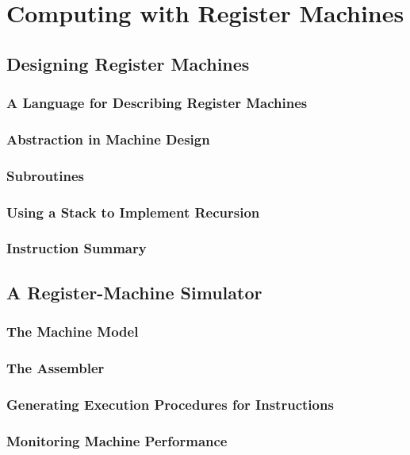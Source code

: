 %

    \section{Computing with Register Machines}
        \subsection{Designing Register Machines}
            \subsubsection{A Language for Describing Register Machines}
            \subsubsection{Abstraction in Machine Design}
            \subsubsection{Subroutines}
            \subsubsection{Using a Stack to Implement Recursion}
            \subsubsection{Instruction Summary}
        \subsection{A Register-Machine Simulator}
            \subsubsection{The Machine Model}
            \subsubsection{The Assembler}
            \subsubsection{Generating Execution Procedures for Instructions}
            \subsubsection{Monitoring Machine Performance}

